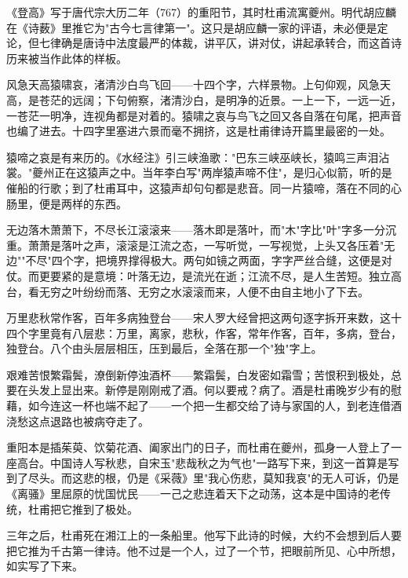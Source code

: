 \begin{appreciation}
《登高》写于唐代宗大历二年（767）的重阳节，其时杜甫流寓夔州。明代胡应麟在《诗薮》里推它为"古今七言律第一"。这只是胡应麟一家的评语，未必便是定论，但七律确是唐诗中法度最严的体裁，讲平仄，讲对仗，讲起承转合，而这首诗历来被当作此体的样板。

风急天高猿啸哀，渚清沙白鸟飞回——十四个字，六样景物。上句仰观，风急天高，是苍茫的远阔；下句俯察，渚清沙白，是明净的近景。一上一下，一远一近，一苍茫一明净，连视角都是对着的。猿啸之哀与鸟飞之回又各自落在句尾，把声音也编了进去。十四字里塞进六景而毫不拥挤，这是杜甫律诗开篇里最密的一处。

猿啼之哀是有来历的。《水经注》引三峡渔歌："巴东三峡巫峡长，猿鸣三声泪沾裳。"夔州正在这猿声之中。当年李白写"两岸猿声啼不住"，是归心似箭，听的是催船的行歌；到了杜甫耳中，这猿声却句句都是悲音。同一片猿啼，落在不同的心肠里，便是两样的东西。

无边落木萧萧下，不尽长江滚滚来——落木即是落叶，而"木"字比"叶"字多一分沉重。萧萧是落叶之声，滚滚是江流之态，一写听觉，一写视觉，上头又各压着"无边""不尽"四个字，把境界撑得极大。两句如镜之两面，字字严丝合缝，这便是对仗。而更要紧的是意境：叶落无边，是流光在逝；江流不尽，是人生苦短。独立高台，看无穷之叶纷纷而落、无穷之水滚滚而来，人便不由自主地小了下去。

万里悲秋常作客，百年多病独登台——宋人罗大经曾把这两句逐字拆开来数，这十四个字里竟有八层悲：万里，离家，悲秋，作客，常年作客，百年，多病，登台，独登台。八个由头层层相压，压到最后，全落在那一个"独"字上。

艰难苦恨繁霜鬓，潦倒新停浊酒杯——繁霜鬓，白发密如霜雪；苦恨积到极处，总要在头发上显出来。新停是刚刚戒了酒。何以要戒？病了。酒是杜甫晚岁少有的慰藉，如今连这一杯也端不起了——一个把一生都交给了诗与家国的人，到老连借酒浇愁这点退路也被病夺走了。

重阳本是插茱萸、饮菊花酒、阖家出门的日子，而杜甫在夔州，孤身一人登上了一座高台。中国诗人写秋悲，自宋玉"悲哉秋之为气也"一路写下来，到这一首算是写到了尽头。而这悲的根，仍是《采薇》里"我心伤悲，莫知我哀"的无人可诉，仍是《离骚》里屈原的忧国忧民——一己之悲连着天下之动荡，这本是中国诗的老传统，杜甫把它推到了极处。

三年之后，杜甫死在湘江上的一条船里。他写下此诗的时候，大约不会想到后人要把它推为千古第一律诗。他不过是一个人，过了一个节，把眼前所见、心中所想，如实写了下来。
\end{appreciation}
